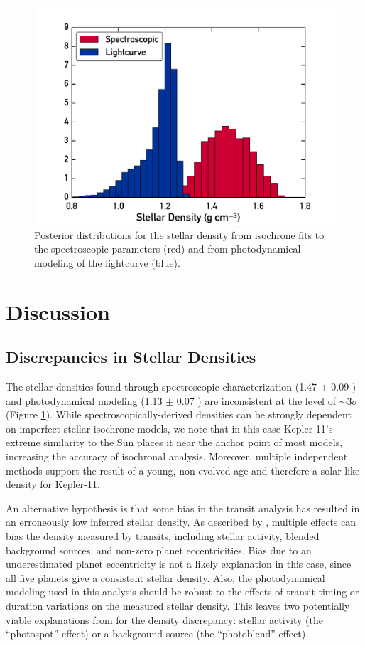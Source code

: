 \documentclass[oneside]{emulateapj}
\begin{document}
\begin{figure}
\centering
\includegraphics[width=\columnwidth]{density}
\caption{Posterior distributions for the stellar density from isochrone fits to the spectroscopic parameters (red) and from photodynamical modeling of the lightcurve (blue).}
\label{fig:densities}
\end{figure}


\section{Discussion}
\label{s:discussion}
\subsection{Discrepancies in Stellar Densities}

The stellar densities found through spectroscopic characterization (1.47 $\pm$ 0.09 \gcm) and photodynamical modeling (1.13 $\pm$ 0.07 \gcm) are inconsistent at the level of $\sim$3$\sigma$  (Figure \ref{fig:densities}). While spectroscopically-derived densities can be strongly dependent on imperfect stellar isochrone models, we note that in this case Kepler-11's extreme similarity to the Sun places it near the anchor point of most models, increasing the accuracy of isochronal analysis. Moreover, multiple independent methods support the result of a young, non-evolved age and therefore a solar-like density for Kepler-11.

An alternative hypothesis is that some bias in the transit analysis has resulted in an erroneously low inferred stellar density. As described by \citet{Kipping2014}, multiple effects can bias the density measured by transits, including stellar activity, blended background sources, and non-zero planet eccentricities. Bias due to an underestimated planet eccentricity is not a likely explanation in this case, since all five planets give a consistent stellar density. Also, the photodynamical modeling used in this analysis should be robust to the effects of transit timing or duration variations on the measured stellar density. This leaves two potentially viable explanations from \citet{Kipping2014} for the density discrepancy: stellar activity (the ``photospot'' effect) or a background source (the ``photoblend'' effect).
\end{document}
